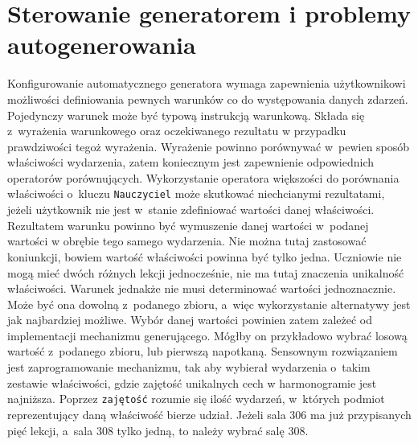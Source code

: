 \documentclass[a4paper]{book}
\begin{document}
\section{Sterowanie generatorem i problemy autogenerowania}
\label{sterowanieiproblemy}
Konfigurowanie automatycznego generatora wymaga zapewnienia użytkownikowi możliwości definiowania pewnych warunków co do występowania danych zdarzeń. Pojedynczy warunek może być typową instrukcją warunkową. Składa się z~wyrażenia warunkowego oraz oczekiwanego rezultatu w przypadku prawdziwości tegoż wyrażenia. Wyrażenie powinno porównywać w~pewien sposób właściwości wydarzenia, zatem koniecznym jest zapewnienie odpowiednich operatorów porównujących. Wykorzystanie operatora większości do porównania właściwości o~kluczu \lstinline|Nauczyciel| może skutkować niechcianymi rezultatami, jeżeli użytkownik nie jest w~stanie zdefiniować wartości danej właściwości. Rezultatem warunku powinno być wymuszenie danej wartości w~podanej wartości w obrębie tego samego wydarzenia. Nie można tutaj zastosować koniunkcji, bowiem wartość właściwości powinna być tylko jedna. Uczniowie nie mogą mieć dwóch różnych lekcji jednocześnie, nie ma tutaj znaczenia unikalność właściwości. Warunek jednakże nie musi determinować wartości jednoznacznie. Może być ona dowolną z~podanego zbioru, a~więc wykorzystanie alternatywy jest jak najbardziej możliwe. Wybór danej wartości powinien zatem zależeć od implementacji mechanizmu generującego. Mógłby on przykładowo wybrać losową wartość z~podanego zbioru, lub pierwszą napotkaną. Sensownym rozwiązaniem jest zaprogramowanie mechanizmu, tak aby wybierał wydarzenia o~takim zestawie właściwości, gdzie zajętość unikalnych cech w harmonogramie jest najniższa. Poprzez \lstinline|zajętość| rozumie się ilość wydarzeń, w~których podmiot reprezentujący daną właściwość bierze udział. Jeżeli sala 306 ma już przypisanych pięć lekcji, a~sala 308 tylko jedną, to należy wybrać salę 308.
\end{document}
